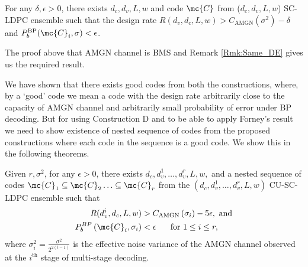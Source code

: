 \documentclass[journal]{IEEEtran}
\begin{document}
\begin{lemma}\label{Lemma:BMSProof2}
For any $\delta ,\epsilon>0$, there exists $d_{c},d_{v},L,w$ and code $\mc{C}$ from ($d_{c},d_{v},L,w$) SC-LDPC  ensemble such that the design rate $R(d_{v},d_{c},L,w)>C_{\text{AMGN}}(\sigma^{2})-\delta$ and $P_{b}^{\text{BP}}(\mc{C}_{i},\sigma)< \epsilon$.

\end{lemma}
\begin{IEEEproof}
The proof above that AMGN channel is BMS and Remark \ref{Rmk:Same_DE} gives us the required result.
\end{IEEEproof}

We have shown that there exists good codes from both the constructions, where, by a `good' code we mean a code with the design rate arbitrarily close to the capacity of AMGN channel and arbitrarily small probability of error under BP decoding. But for using Construction D and to be able to apply Forney's result we need to show existence of nested sequence of codes from the proposed constructions where each code in the sequence is a good code. We show this in the following theorems.

\begin{lemma}\label{Lemma:NestedGoodCodes1}
Given $r,\sigma^{2}$, for any $\epsilon>0$, there exists $d_{c},d_{v}^{1},\ldots, d_{v}^{r},L,w,$ and a nested sequence of codes $\mc{C}_{1}\subseteq \mc{C}_{2}\ldots \subseteq\mc{C}_{r}$ from the $(d_{c},d_{v}^{1},\ldots,d_{v}^{r},L,w)$ CU-SC-	LDPC ensemble such that 
\begin{align}
R(d_{v}^{i},d_{c},L,w)&>C_{\text{AMGN}}\left(\sigma_{i}\right)-5\epsilon, \text{ and} \label{Eqn:RateConditions1}\\
P_{b}^{BP}\left(\mc{C}_{i},\sigma_{i}\right)&<\epsilon \hspace{0.5cm}\text{ for }1\leq i \leq r\label{Eqn:Error Prob1},
\end{align}
where $\sigma_{i}^{2}=\frac{\sigma^{2}}{2^{2(i-1)}}$ is the effective noise variance of the AMGN channel observed 	at the $i^{\text{th}}$ stage of multi-stage decoding.
\end{lemma}
\end{document}
